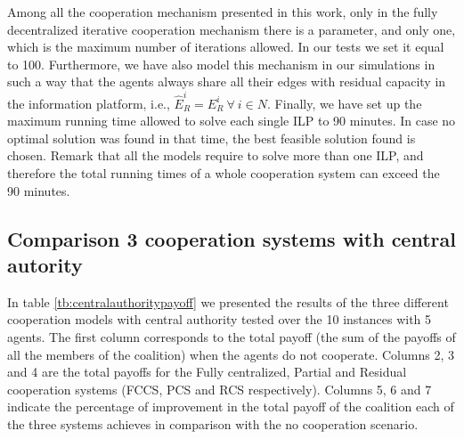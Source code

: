 \documentclass{article}
\begin{document}
Among all the cooperation mechanism presented in this work, only in the fully decentralized iterative cooperation mechanism there is a parameter, and only one, which is the maximum number of iterations allowed. In our tests we set it equal to 100. Furthermore, we have also model this mechanism in our simulations in such a way that the agents always share all their edges with residual capacity in the information platform, i.e., $\widehat{E}_R^i=E_R^i\ \forall\ i\in N$. Finally, we have set up the maximum running time allowed to solve each single ILP to 90 minutes. In case no optimal solution was found in that time, the best feasible solution found is chosen. Remark that all the models require to solve more than one ILP, and therefore the total running times of a whole cooperation system can exceed the 90 minutes.

\subsection{Comparison 3 cooperation systems with central autority}

In table \ref{tb:centralauthoritypayoff} we presented the results of the three different cooperation models with central authority tested over the 10 instances with 5 agents. The first column corresponds to the total payoff (the sum of the payoffs of all the members of the coalition) when the agents do not cooperate. Columns 2, 3 and 4 are the total payoffs for the Fully centralized, Partial and Residual cooperation systems (FCCS, PCS and RCS respectively). Columns 5, 6 and 7 indicate the percentage of improvement in the total payoff of the coalition each of the three systems achieves in comparison with the no cooperation scenario.
\end{document}
